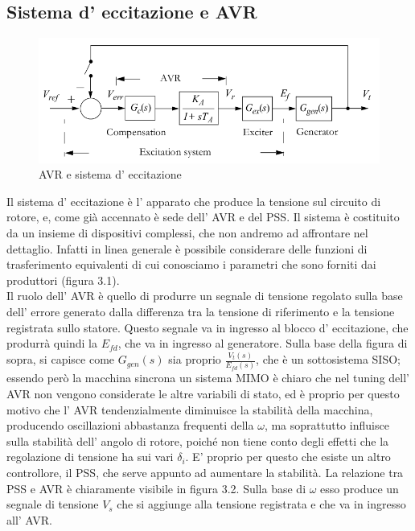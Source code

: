 \documentclass[Lau,noexaminfo]{sapthesis}
\begin{document}
	\subsection{Sistema d' eccitazione e AVR}
	\begin{figure}
		\centering
		\includegraphics[height=0.20\textheight]{AVR}
		\caption{AVR e sistema d' eccitazione}
	\end{figure}
	Il sistema d' eccitazione è l' apparato che produce la tensione sul circuito di rotore, e, come già accennato è sede dell' AVR e del PSS. Il sistema è costituito da un insieme di dispositivi complessi, che non andremo ad affrontare nel dettaglio. Infatti in linea generale è possibile considerare delle funzioni di trasferimento equivalenti di cui conosciamo i parametri che sono forniti dai produttori (figura 3.1).\\
	Il ruolo dell' AVR è quello di produrre un segnale di tensione regolato sulla base dell' errore generato dalla differenza tra la tensione di riferimento e la tensione registrata sullo statore. Questo segnale va in ingresso al blocco d' eccitazione, che produrrà quindi la $E_{fd}$, che va in ingresso al generatore. Sulla base della figura di sopra, si capisce come $G_{gen}(s)$ sia proprio $\frac{V_t(s)}{E_{fd}(s)}$, che è un sottosistema SISO; essendo però la macchina sincrona un sistema MIMO è chiaro che nel tuning dell' AVR non vengono considerate le altre variabili di stato, ed è proprio per questo motivo che l' AVR tendenzialmente diminuisce la stabilità della macchina, producendo oscillazioni abbastanza frequenti della $\omega$, ma soprattutto influisce sulla stabilità dell' angolo di rotore, poiché non tiene conto degli effetti che la regolazione di tensione ha sui vari $\delta_i$. E' proprio per questo che esiste un altro controllore, il PSS, che serve appunto ad aumentare la stabilità. La relazione tra PSS e AVR è chiaramente visibile in figura 3.2. Sulla base di $\omega$ esso produce un segnale di tensione $V_s$ che si aggiunge alla tensione registrata e che va in ingresso all' AVR.\\
\end{document}
